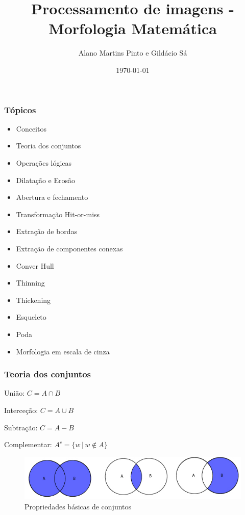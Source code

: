 \documentclass[aspectratio=169]{beamer}
\title[\sc{Processamento de imagens}]{Processamento de imagens - Morfologia Matemática}
\author[Alano Martins Pinto]{Alano Martins Pinto e Gildácio Sá}
\institute{UECE - Universidade Estadual do Ceará} %
\date{\today}
\theoremstyle{Definition}
\begin{document}
\begin{frame}
	\titlepage
\end{frame}


\begin{frame}
	\frametitle{Tópicos}
	\begin{itemize}
		\item Conceitos
		\item Teoria dos conjuntos
		\item Operações lógicas
		\item Dilatação e Erosão
		\item Abertura e fechamento
		\item Transformação Hit-or-miss
		\item Extração de bordas
		\item Extração de componentes conexas
		\item Conver Hull
		\item Thinning
		\item Thickening
		\item Esqueleto
		\item Poda
		\item Morfologia em escala de cinza
	\end{itemize}

\end{frame}


\begin{frame}\frametitle{Teoria dos conjuntos}

União: $C = A \cap B $ 

Interceção: $C = A \cup B $ 

Subtração: $C = A - B $ 

Complementar: $A^{c} = \{w \,|\, w \not\in A  \}$ 

  \begin{figure}[h]
    \centering
    \includegraphics[height=0.3\paperheight]{imagens/basic_sets}
    \caption{Propriedades básicas de conjuntos}\label{figConjuntos}
  \end{figure}

\end{frame}
\end{document}
